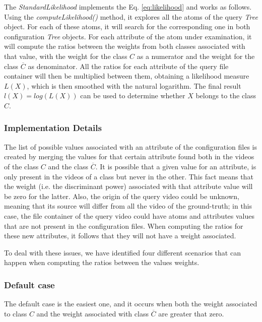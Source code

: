 The \emph{StandardLikelihood} implements the Eq. \ref{eq:likelihood} and works as follows. Using the \emph{computeLikelihood()} method, it explores all the atoms of the query \emph{Tree} object. For each of these atoms, it will search for the corresponding one in both configuration \emph{Tree} objects. For each attribute of the atom under examination, it will compute the ratios between the weights from both classes associated with that value, with the weight for the class $C$ as a numerator and the weight for the class $\overline{C}$ as denominator. All the ratios for each attribute of the query file container will then be multiplied between them, obtaining a likelihood measure $L(X)$, which is then smoothed with the natural logarithm. 
The final result $l(X) = log(L(X))$ can be used to determine whether $X$ belongs to the class $C$.


\subsubsection*{Implementation Details}

The list of possible values associated with an attribute of the configuration files is created by merging the values for that certain attribute found both in the videos of the class $C$ and the class $\overline{C}$. It is possible that a given value for an attribute, is only present in the videos of a class but never in the other. This fact means that the weight (i.e. the discriminant power) associated with that attribute value will be zero for the latter.
Also, the origin of the query video could be unknown, meaning that its source will differ from all the video of the ground-truth; in this case, the file container of the query video could have atoms and attributes values that are not present in the configuration files. When computing the ratios for these new attributes, it follows that they will not have a weight associated.

To deal with these issues, we have identified four different scenarios that can happen when computing the ratios between the values weights.

\subsubsection*{Default case}

The default case is the easiest one, and it occurs when both the weight associated to class $C$ and the weight associated with class $\overline{C}$ are greater that zero.

